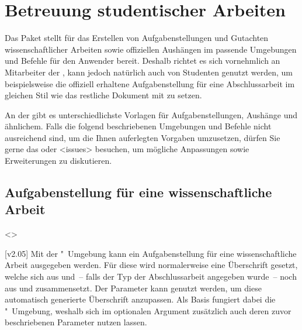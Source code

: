 \chapter[%
  Das Paket \Package{tudscrsupervisor} -- Studentische Betreuung%
]{%
  Betreuung studentischer Arbeiten%
}
\begin{DeclareEntity}{}
%
Das Paket  stellt für das Erstellen von 
Aufgabenstellungen und Gutachten wissenschaftlicher Arbeiten sowie offiziellen 
Aushängen im \CD passende Umgebungen und Befehle für den Anwender bereit. 
Deshalb richtet es sich vornehmlich an Mitarbeiter der \TnUD, kann jedoch 
natürlich auch von Studenten genutzt werden, um beispielsweise die offiziell 
erhaltene Aufgabenstellung für eine Abschlussarbeit im gleichen Stil wie das 
restliche Dokument mit  zu setzen.

An der \TUD gibt es unterschiedlichste Vorlagen für Aufgabenstellungen, 
Aushänge und ähnlichem. Falls die folgend beschriebenen Umgebungen und Befehle 
nicht ausreichend sind, um die Ihnen auferlegten Vorgaben umzusetzen, dürfen 
Sie gerne das \Forum oder \GitHubRepo<issues> besuchen, um mögliche 
Anpassungen sowie Erweiterungen zu diskutieren.



\section{%
  Aufgabenstellung für eine wissenschaftliche Arbeit%
}
%
\begin{Declaration}
  {}
  <>
\begin{Declaration}
  {}
\begin{Declaration}
  {}
  [v2.05]
\printdeclarationlist
%
Mit der "~Umgebung kann ein Aufgabenstellung für eine 
wissenschaftliche Arbeit ausgegeben werden. Für diese wird normalerweise eine 
Überschrift gesetzt, welche sich aus  und~-- falls der Typ der 
Abschlussarbeit angegeben wurde~-- noch aus  und  
zusammensetzt. Der Parameter  kann genutzt werden, 
um diese automatisch generierte Überschrift anzupassen. Als Basis fungiert 
dabei die "~Umgebung, weshalb sich im optionalen Argument 
zusätzlich auch deren zuvor beschriebenen Parameter nutzen lassen.


\end{Declaration}
\end{Declaration}
\end{Declaration}
\end{DeclareEntity}
